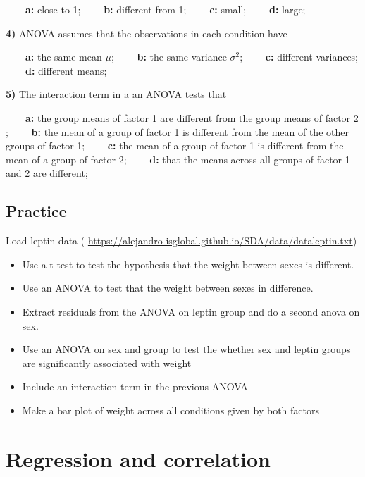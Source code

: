 \documentclass[
]{book}
\begin{document}
\textbf{\(\qquad\)a:} close to 1;
\textbf{\(\qquad\)b:} different from 1;
\textbf{\(\qquad\)c:} small;
\textbf{\(\qquad\)d:} large;

\textbf{4)} ANOVA assumes that the observations in each condition have

\textbf{\(\qquad\)a:} the same mean \(\mu\);
\textbf{\(\qquad\)b:} the same variance \(\sigma^2\);
\textbf{\(\qquad\)c:} different variances;
\textbf{\(\qquad\)d:} different means;

\textbf{5)} The interaction term in a an ANOVA tests that

\textbf{\(\qquad\)a:} the group means of factor 1 are different from the group means of factor 2 ;
\textbf{\(\qquad\)b:} the mean of a group of factor 1 is different from the mean of the other groups of factor 1;
\textbf{\(\qquad\)c:} the mean of a group of factor 1 is different from the mean of a group of factor 2;
\textbf{\(\qquad\)d:} that the means across all groups of factor 1 and 2 are different;

\hypertarget{practice-7}{%
\section{Practice}\label{practice-7}}

Load leptin data (
\url{https://alejandro-isglobal.github.io/SDA/data/dataleptin.txt})

\begin{itemize}
\item
  Use a t-test to test the hypothesis that the weight between sexes is different.
\item
  Use an ANOVA to test that the weight between sexes in difference.
\item
  Extract residuals from the ANOVA on leptin group and do a second anova on sex.
\item
  Use an ANOVA on sex and group to test the whether sex and leptin groups are significantly associated with weight
\item
  Include an interaction term in the previous ANOVA
\item
  Make a bar plot of weight across all conditions given by both factors
\end{itemize}

\hypertarget{regression-and-correlation}{%
\chapter{Regression and correlation}\label{regression-and-correlation}}
\end{document}
